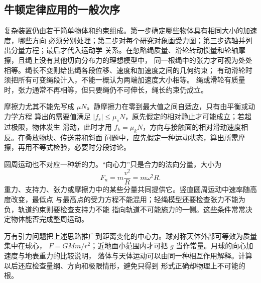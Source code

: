 \subsection{牛顿定律应用的一般次序}

复杂装置仍由若干简单物体和约束组成。第一步确定哪些物体具有相同大小的加速度，哪些方向
必须分别处理；第二步对每个研究对象画受力图；第三步选轴并列出分量方程；最后才代入运动学
关系。在忽略绳质量、滑轮转动惯量和轮轴摩擦，且绳上没有其他切向分布力的理想模型中，
同一根绳中的张力才可视为处处相等。绳长不变则给出绳各段位移、速度和加速度之间的几何约束；
有动滑轮时须把所有可变绳段计入，不能一概认为两端加速度大小相等。
绳或滑轮有质量时，张力通常不再相等，但只要绳仍不可伸长，绳长约束仍成立。

摩擦力尤其不能先写成 $\mu N$。静摩擦力在零到最大值之间自适应，只有由平衡或动力学方程
算出的需要值满足 $|f_s|\leq\mu_sN$，原先假定的相对静止才可能成立；若超过极限，物体发生
滑动，此时才用 $f_k=\mu_kN$，方向与接触面的相对滑动速度相反。在叠放物块、传送带和斜面
问题中，应先假定一种运动状态，算出所需摩擦，再用不等式检验，必要时分段讨论。

圆周运动也不对应一种新的力。“向心力”只是合力的法向分量，大小为
\begin{equation}
 F_n=m\frac{v^2}{R}=m\omega^2R.
\end{equation}
重力、支持力、张力或摩擦力中的某些分量共同提供它。竖直圆周运动中速率随高度改变，最低点
与最高点的受力方程不能混用；轻绳模型还要检查张力不能为负，轨道约束则要检查支持力不能
指向轨道不可能施力的一侧。这些条件常常决定物体能否完成整周运动。

万有引力问题把上述思路推广到距离变化的中心力。球对称天体外部可等效为质量集中在球心，
$F=GMm/r^2$；近地面小范围内才可把 $g$ 当作常量。月球的向心加速度与地表重力的比较说明，
落体与天体运动可以由同一种相互作用解释。计算以后还应检查量纲、方向和极限情形，避免只得到
形式正确却物理上不可能的根。
